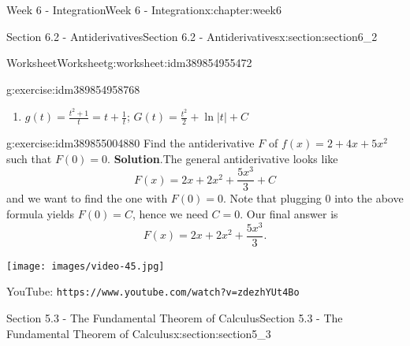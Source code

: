 \documentclass[oneside,10pt,]{book}
\newcommand{\blocktitlefont}{\relax}
\newcommand{\mono}[1]{\texttt{#1}}
\numberwithin{equation}{section}
\newlength{\qrsize}
\newlength{\previewwidth}
\begin{document}
\begin{chapterptx}{Week 6 - Integration}{}{Week 6 - Integration}{}{}{x:chapter:week6}
\begin{sectionptx}{Section 6.2 - Antiderivatives}{}{Section 6.2 - Antiderivatives}{}{}{x:section:section6_2}
\begin{worksheet-subsection}{Worksheet}{}{Worksheet}{}{}{g:worksheet:idm389854955472}
\begin{divisionexercise}{1}{}{}{g:exercise:idm389854958768}
\begin{enumerate}[label=(\alph*)]
\item{}\(g(t)=\frac{t^2+1}{t}=t+\frac 1t\); \(G(t) = \frac{t^2}{2}+\ln{\vert t \vert}+C\)%
\end{enumerate}
\end{divisionexercise}%
\begin{divisionexercise}{2}{}{}{g:exercise:idm389855004880}%
Find the antiderivative \(F\) of \(f(x)=2+4x+5x^2\) such that \(F(0)=0\).%
\textbf{\blocktitlefont Solution}.\hypertarget{g:solution:idm389855017264}{}\quad{}The general antiderivative looks like%
\begin{equation*}
F(x) = 2x+2x^2+\frac{5x^3}{3}+C 
\end{equation*}
and we want to find the one with \(F(0)=0\). Note that plugging 0 into the above formula yields \(F(0)=C\), hence we need \(C=0\). Our final answer is%
\begin{equation*}
F(x) = 2x+2x^2+\frac{5x^3}{3} \text{.}
\end{equation*}
%
\end{divisionexercise}%
\end{worksheet-subsection}
\restoregeometry
\setlength{\qrsize}{9em}
\setlength{\previewwidth}{\linewidth}
\addtolength{\previewwidth}{-\qrsize}
\begin{tcbraster}[raster columns=2, raster column skip=1pt, raster halign=center, raster force size=false, raster left skip=0pt, raster right skip=0pt]%
\begin{tcolorbox}[previewstyle, width=\previewwidth]%
\texttt{[image: images/video-45.jpg]}%
\end{tcolorbox}%
\begin{tcolorbox}[qrstyle]%
{\hypersetup{urlcolor=black}}%
\end{tcolorbox}%
\begin{tcolorbox}[captionstyle]%
\small YouTube: \mono{https://www.youtube.com/watch?v=zdezhYUt4Bo}\end{tcolorbox}%
\end{tcbraster}%
\end{sectionptx}
%
%
\typeout{************************************************}
\typeout{************************************************}
%
\begin{sectionptx}{Section 5.3 - The Fundamental Theorem of Calculus}{}{Section 5.3 - The Fundamental Theorem of Calculus}{}{}{x:section:section5_3}
\setlength{\qrsize}{9em}
\setlength{\previewwidth}{\linewidth}

\end{sectionptx}
\end{chapterptx}
\end{document}
